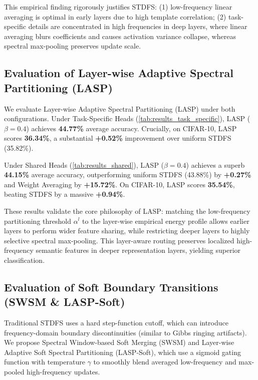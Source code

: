 \documentclass{article}
\theoremstyle{plain}
\theoremstyle{definition}
\theoremstyle{remark}
\begin{document}
This empirical finding rigorously justifies STDFS: (1) low-frequency linear averaging is optimal in early layers due to high template correlation; (2) task-specific details are concentrated in high frequencies in deep layers, where linear averaging blurs coefficients and causes activation variance collapse, whereas spectral max-pooling preserves update scale.

\subsection{Evaluation of Layer-wise Adaptive Spectral Partitioning (LASP)}
We evaluate Layer-wise Adaptive Spectral Partitioning (LASP) under both configurations. Under Task-Specific Heads (\cref{tab:results_task_specific}), LASP ($\beta=0.4$) achieves \textbf{44.77\%} average accuracy. Crucially, on CIFAR-10, LASP scores \textbf{36.34\%}, a substantial \textbf{+0.52\%} improvement over uniform STDFS (35.82\%). 

Under Shared Heads (\cref{tab:results_shared}), LASP ($\beta=0.4$) achieves a superb \textbf{44.15\%} average accuracy, outperforming uniform STDFS (43.88\%) by \textbf{+0.27\%} and Weight Averaging by \textbf{+15.72\%}. On CIFAR-10, LASP scores \textbf{35.54\%}, beating STDFS by a massive \textbf{+0.94\%}.

These results validate the core philosophy of LASP: matching the low-frequency partitioning threshold $\alpha^l$ to the layer-wise empirical energy profile allows earlier layers to perform wider feature sharing, while restricting deeper layers to highly selective spectral max-pooling. This layer-aware routing preserves localized high-frequency semantic features in deeper representation layers, yielding superior classification.

\subsection{Evaluation of Soft Boundary Transitions (SWSM \& LASP-Soft)}
Traditional STDFS uses a hard step-function cutoff, which can introduce frequency-domain boundary discontinuities (similar to Gibbs ringing artifacts). We propose Spectral Window-based Soft Merging (SWSM) and Layer-wise Adaptive Soft Spectral Partitioning (LASP-Soft), which use a sigmoid gating function with temperature $\gamma$ to smoothly blend averaged low-frequency and max-pooled high-frequency updates.
\end{document}
